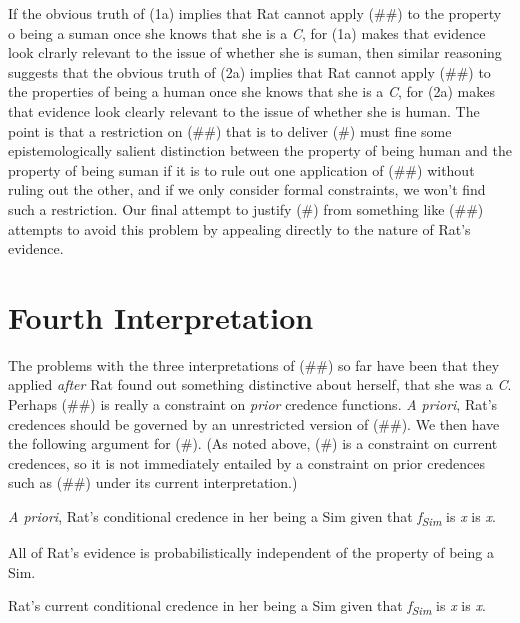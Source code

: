 \documentclass[
  11pt,
  letterpaper,
  DIV=11,
  numbers=noendperiod,
  twoside]{scrartcl}
\providecommand{\tightlist}{%
  \setlength{\itemsep}{0pt}\setlength{\parskip}{0pt}}
\begin{document}
If the obvious truth of (1a) implies that Rat cannot apply (\#\#) to the
property o being a suman once she knows that she is a \emph{C}, for (1a)
makes that evidence look clrarly relevant to the issue of whether she is
suman, then similar reasoning suggests that the obvious truth of (2a)
implies that Rat cannot apply (\#\#) to the properties of being a human
once she knows that she is a \emph{C}, for (2a) makes that evidence look
clearly relevant to the issue of whether she is human. The point is that
a restriction on (\#\#) that is to deliver (\#) must fine some
epistemologically salient distinction between the property of being
human and the property of being suman if it is to rule out one
application of (\#\#) without ruling out the other, and if we only
consider formal constraints, we won't find such a restriction. Our final
attempt to justify (\#) from something like (\#\#) attempts to avoid
this problem by appealing directly to the nature of Rat's evidence.

\section{Fourth Interpretation}\label{fourth-interpretation}

The problems with the three interpretations of (\#\#) so far have been
that they applied \emph{after} Rat found out something distinctive about
herself, that she was a \emph{C}. Perhaps (\#\#) is really a constraint
on \emph{prior} credence functions. \emph{A priori}, Rat's credences
should be governed by an unrestricted version of (\#\#). We then have
the following argument for (\#). (As noted above, (\#) is a constraint
on current credences, so it is not immediately entailed by a constraint
on prior credences such as (\#\#) under its current interpretation.)

\newpage

\begin{description}
\tightlist
\item[P1]
\emph{A priori}, Rat's conditional credence in her being a Sim given
that \emph{f\textsubscript{Sim}} is \emph{x} is \emph{x}.
\item[P2]
All of Rat's evidence is probabilistically independent of the property
of being a Sim.
\item[C]
Rat's current conditional credence in her being a Sim given that
\emph{f\textsubscript{Sim}} is \emph{x} is \emph{x}.
\end{description}
\end{document}
